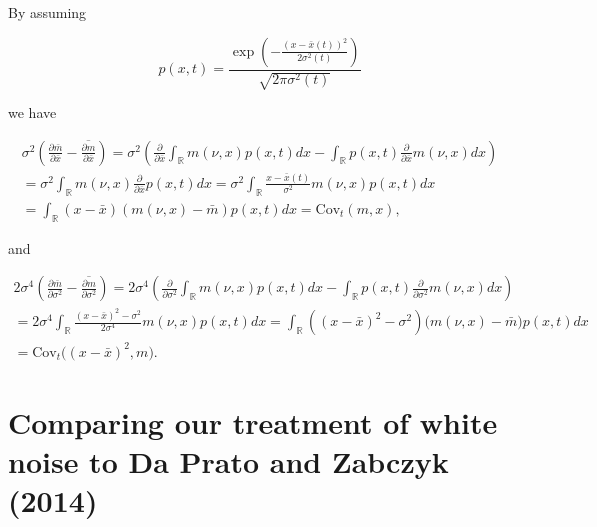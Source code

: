 \documentclass[]{article}
\begin{document}
By assuming

\begin{equation}
p(x,t)=\frac{\exp\left(-\frac{(x-\bar x(t))^2}{2\sigma^2(t)}\right)}{\sqrt{2\pi\sigma^2(t)}}
\end{equation}

we have

\begin{multline}
\sigma^2\left(\frac{\partial\bar m}{\partial\bar x}-\overline{\frac{\partial m}{\partial\bar x}}\right)=\sigma^2\left(\frac{\partial}{\partial\bar x}\int_\mathbb{R}m(\nu,x)p(x,t)dx-\int_\mathbb{R}p(x,t)\frac{\partial}{\partial \bar x}m(\nu,x)dx\right)\\=\sigma^2\int_\mathbb{R}m(\nu,x)\frac{\partial}{\partial\bar x}p(x,t)dx=\sigma^2\int_\mathbb{R}\frac{x-\bar x(t)}{\sigma^2}m(\nu,x)p(x,t)dx\\=\int_\mathbb{R}(x-\bar x)(m(\nu,x)-\bar m)p(x,t)dx=\mathrm{Cov}_t(m,x),
\end{multline}

and

\begin{multline}
2\sigma^4\left(\frac{\partial\bar m}{\partial\sigma^2}-\overline{\frac{\partial m}{\partial\sigma^2}}\right)=2\sigma^4\left(\frac{\partial}{\partial\sigma^2}\int_\mathbb{R}m(\nu,x)p(x,t)dx-\int_\mathbb{R}p(x,t)\frac{\partial}{\partial\sigma^2}m(\nu,x)dx\right)\\=2\sigma^4\int_\mathbb{R}\frac{(x-\bar x)^2-\sigma^2}{2\sigma^4}m(\nu,x)p(x,t)dx=\int_\mathbb{R}\left((x-\bar x)^2-\sigma^2\right)\big(m(\nu,x)-\bar m\big)p(x,t)dx\\=\mathrm{Cov}_t\Big((x-\bar x)^2,m\Big).
\end{multline}

\hypertarget{comparing-our-treatment-of-white-noise-to-da-prato-and-zabczyk-2014}{%
\section{\texorpdfstring{Comparing our treatment of white noise to Da
Prato and Zabczyk (2014)
\label{DPZ14}}{Comparing our treatment of white noise to Da Prato and Zabczyk (2014) }}\label{comparing-our-treatment-of-white-noise-to-da-prato-and-zabczyk-2014}}
\end{document}
